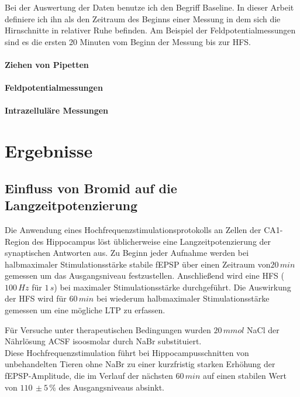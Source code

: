 \documentclass[a4paper,11pt]{report}
\begin{document}
{Bei der Auswertung der Daten benutze ich den Begriff Baseline. In dieser Arbeit definiere ich ihn als den Zeitraum des Beginns einer Messung in dem sich die Hirnschnitte in relativer Ruhe befinden. Am Beispiel der Feldpotentialmessungen sind es die ersten 20 Minuten vom Beginn der Messung bis zur HFS. 

\subsubsection{Ziehen von Pipetten}

\subsubsection{Feldpotentialmessungen}

\subsubsection{Intrazelluläre Messungen}

\chapter{Ergebnisse}
\section{Einfluss von Bromid auf die Langzeitpotenzierung}
Die Anwendung eines Hochfrequenzstimulationsprotokolls an Zellen der CA1-Region des Hippocampus  löst üblicherweise eine Langzeitpotenzierung der synaptischen Antworten aus. Zu Beginn  jeder Aufnahme werden bei halbmaximaler Stimulationsstärke stabile fEPSP über einen Zeitraum von$20\, min$ gemessen um das Ausgangsniveau festzustellen. Anschließend wird eine HFS ($100\,Hz$ für $1\,s$) bei maximaler Stimulationsstärke durchgeführt. Die Auswirkung der HFS wird für $60\, min$ bei wiederum halbmaximaler Stimulationsstärke gemessen um eine mögliche LTP zu erfassen.

Für Versuche unter therapeutischen Bedingungen wurden  $20\, mmol$ NaCl der Nährlösung ACSF isoosmolar durch NaBr substituiert.\\

 Diese Hochfrequenzstimulation führt bei Hippocampusschnitten von unbehandelten Tieren ohne NaBr zu einer kurzfristig starken Erhöhung der fEPSP-Amplitude, die im Verlauf der nächsten $60\, min$ auf einen stabilen Wert von $110\,\pm 5\,\%$ des Ausgangsniveaus absinkt.

}
\end{document}
